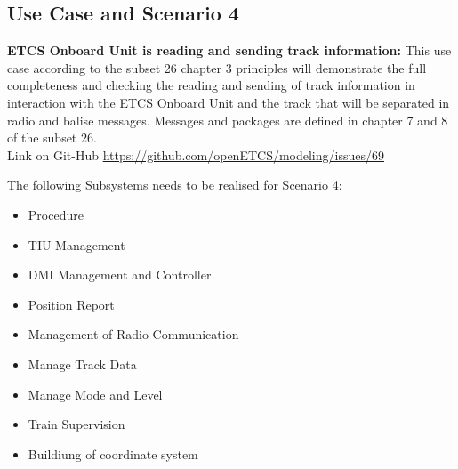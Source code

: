 \subsection{Use Case and Scenario 4}
\textbf{ETCS Onboard Unit is reading and sending track information:}
This use case according to the subset 26 chapter 3 principles will demonstrate the full completeness and checking the reading and sending of track information in interaction with the ETCS Onboard Unit and the track that will be separated in radio and balise messages. Messages and packages are defined in chapter 7 and 8 of the subset 26.\\ 
Link on Git-Hub \url{https://github.com/openETCS/modeling/issues/69}

The following Subsystems needs to be realised for Scenario 4:\\
\begin{itemize}
\item Procedure
\item TIU Management
\item DMI Management and Controller
\item Position Report
\item Management of Radio Communication
\item Manage Track Data
\item Manage Mode and Level
\item Train Supervision
\item Buildiung of coordinate system
\end{itemize}



